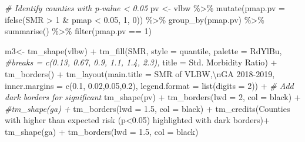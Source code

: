 \documentclass[
]{book}
\newenvironment{Shaded}{\begin{snugshade}}{\end{snugshade}}
\newcommand{\AttributeTok}[1]{\textcolor[rgb]{0.77,0.63,0.00}{#1}}
\newcommand{\CommentTok}[1]{\textcolor[rgb]{0.56,0.35,0.01}{\textit{#1}}}
\newcommand{\DecValTok}[1]{\textcolor[rgb]{0.00,0.00,0.81}{#1}}
\newcommand{\FloatTok}[1]{\textcolor[rgb]{0.00,0.00,0.81}{#1}}
\newcommand{\FunctionTok}[1]{\textcolor[rgb]{0.00,0.00,0.00}{#1}}
\newcommand{\NormalTok}[1]{#1}
\newcommand{\OtherTok}[1]{\textcolor[rgb]{0.56,0.35,0.01}{#1}}
\newcommand{\SpecialCharTok}[1]{\textcolor[rgb]{0.00,0.00,0.00}{#1}}
\newcommand{\StringTok}[1]{\textcolor[rgb]{0.31,0.60,0.02}{#1}}
\begin{document}
\begin{Shaded}
\begin{Highlighting}[]
\CommentTok{\# Identify counties with p{-}value \textless{} 0.05}
\NormalTok{pv }\OtherTok{\textless{}{-}}\NormalTok{ vlbw }\SpecialCharTok{\%\textgreater{}\%}
  \FunctionTok{mutate}\NormalTok{(}\AttributeTok{pmap.pv =} \FunctionTok{ifelse}\NormalTok{(SMR }\SpecialCharTok{\textgreater{}} \DecValTok{1} \SpecialCharTok{\&}\NormalTok{ pmap }\SpecialCharTok{\textless{}} \FloatTok{0.05}\NormalTok{, }\DecValTok{1}\NormalTok{, }\DecValTok{0}\NormalTok{)) }\SpecialCharTok{\%\textgreater{}\%}
  \FunctionTok{group\_by}\NormalTok{(pmap.pv) }\SpecialCharTok{\%\textgreater{}\%}
  \FunctionTok{summarise}\NormalTok{() }\SpecialCharTok{\%\textgreater{}\%}
  \FunctionTok{filter}\NormalTok{(pmap.pv }\SpecialCharTok{==} \DecValTok{1}\NormalTok{)}


\NormalTok{m3}\OtherTok{\textless{}{-}} \FunctionTok{tm\_shape}\NormalTok{(vlbw) }\SpecialCharTok{+}
  \FunctionTok{tm\_fill}\NormalTok{(}\StringTok{\textquotesingle{}SMR\textquotesingle{}}\NormalTok{,}
          \AttributeTok{style =} \StringTok{\textquotesingle{}quantile\textquotesingle{}}\NormalTok{,}
          \AttributeTok{palette =} \StringTok{\textquotesingle{}{-}RdYlBu\textquotesingle{}}\NormalTok{,}
          \CommentTok{\#breaks = c(0.13, 0.67, 0.9, 1.1, 1.4, 2.3),}
          \AttributeTok{title =} \StringTok{\textquotesingle{}Std. Morbidity Ratio\textquotesingle{}}\NormalTok{) }\SpecialCharTok{+} 
  \FunctionTok{tm\_borders}\NormalTok{() }\SpecialCharTok{+}
  \FunctionTok{tm\_layout}\NormalTok{(}\AttributeTok{main.title =} \StringTok{\textquotesingle{}SMR of VLBW,}\SpecialCharTok{\textbackslash{}n}\StringTok{GA 2018{-}2019\textquotesingle{}}\NormalTok{,}
            \AttributeTok{inner.margins =} \FunctionTok{c}\NormalTok{(}\FloatTok{0.1}\NormalTok{, }\FloatTok{0.02}\NormalTok{,}\FloatTok{0.05}\NormalTok{,}\FloatTok{0.2}\NormalTok{),}
            \AttributeTok{legend.format =} \FunctionTok{list}\NormalTok{(}\AttributeTok{digits =} \DecValTok{2}\NormalTok{)) }\SpecialCharTok{+}
  \CommentTok{\# Add dark borders for significant}
  \FunctionTok{tm\_shape}\NormalTok{(pv) }\SpecialCharTok{+}
  \FunctionTok{tm\_borders}\NormalTok{(}\AttributeTok{lwd =} \DecValTok{2}\NormalTok{, }\AttributeTok{col =} \StringTok{\textquotesingle{}black\textquotesingle{}}\NormalTok{) }\SpecialCharTok{+}
  \CommentTok{\#tm\_shape(ga) + }
  \FunctionTok{tm\_borders}\NormalTok{(}\AttributeTok{lwd =} \FloatTok{1.5}\NormalTok{, }\AttributeTok{col =} \StringTok{\textquotesingle{}black\textquotesingle{}}\NormalTok{) }\SpecialCharTok{+}
  \FunctionTok{tm\_credits}\NormalTok{(}\StringTok{\textquotesingle{}Counties with higher than expected risk (p\textless{}0.05) highlighted with dark borders\textquotesingle{}}\NormalTok{)}\SpecialCharTok{+}
  \FunctionTok{tm\_shape}\NormalTok{(ga) }\SpecialCharTok{+}
  \FunctionTok{tm\_borders}\NormalTok{(}\AttributeTok{lwd =} \FloatTok{1.5}\NormalTok{, }\AttributeTok{col =} \StringTok{\textquotesingle{}black\textquotesingle{}}\NormalTok{)}


\end{Highlighting}
\end{Shaded}
\end{document}
